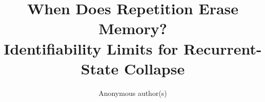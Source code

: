 \documentclass[10pt]{article}
\title{When Does Repetition Erase Memory?\\Identifiability Limits for Recurrent-State Collapse}
\author{Anonymous author(s)}
\date{}
\theoremstyle{plain}
\theoremstyle{definition}
\theoremstyle{remark}
\begin{document}
\maketitle










\label{main-text-end}
\clearpage
\begingroup
\small
\setlength{\bibsep}{3pt}


\endgroup
\clearpage
\appendix




\clearpage

\clearpage

\end{document}
